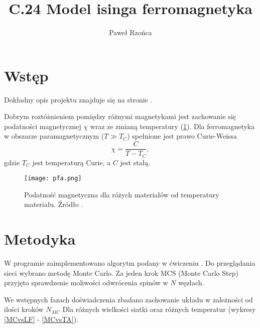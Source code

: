\documentclass[11pt]{article}
\title{C.24 Model isinga ferromagnetyka}
\author{Paweł Rzońca}
\date{}
\begin{document}
\maketitle

\section*{Wstęp}

Dokładny opis projektu znajduje się na stronie \cite{strona}.

Dobrym roztóżnieniem pomiędzy różnymi magnetykami jest zachowanie się 
podatności magnetycznej $\chi$ wraz ze zmianą temperatury (\ref{pfa}). 
Dla ferromagnetyka 
w obszarze paramagnetycznym ($T \gg T_C$) spełnione jest prawo Curie-Weissa
\begin{equation}
\chi = \frac{C}{T-T_C},
\end{equation}
gdzie $T_C$ jest temperaturą Curie, a $C$ jest stałą.

\begin{figure}
\centering
\texttt{[image: pfa.png]}
\caption{Podatność magnetyczna dla różych materiałów od temperatury materiału. 
Źródło \cite{Kittel}.}
{\label{pfa}}
\end{figure}


\section*{Metodyka}
W programie zaimplementowano algorytm podany w ćwiczeniu \cite{strona}.
Do przeglądania sieci wybrano metodę Monte Carlo. Za jeden krok MCS
(Monte Carlo Step) przyjęto sprawdzenie moliwości odwrócenia spinów w $N$ węzłach. 

We wstępnych fazach doświadczenia zbadano zachowanie układu 
w zależności od ilości kroków $N_{MC}$ Dla różnych wielkości 
siatki oraz różnych temperatur (wykresy \ref{MCvsLF} - \ref{MCvsTA}).
\end{document}
